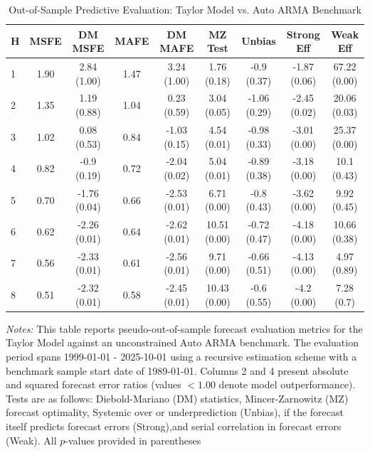\begin{table}[htbp]
\centering
\caption{Out-of-Sample Predictive Evaluation: Taylor Model vs. Auto ARMA Benchmark}
\label{tab:taylor_model_evaluation}
\footnotesize
\begin{tabular}{l cccccccc}
\hline\hline
\rule{0pt}{3ex}
\textbf{H} & \textbf{MSFE} & \textbf{DM MSFE} & \textbf{MAFE} & \textbf{DM MAFE} & \textbf{MZ Test} & \textbf{Unbias} & \textbf{Strong Eff} & \textbf{Weak Eff} \\[0.5ex]
\hline
\rule{0pt}{2.5ex}
1 & 1.90 & 2.84 (1.00) & 1.47 & 3.24 (1.00) & 1.76 (0.18) & -0.9 (0.37) & -1.87 (0.06) & 67.22 (0.00) \\
2 & 1.35 & 1.19 (0.88) & 1.04 & 0.23 (0.59) & 3.04 (0.05) & -1.06 (0.29) & -2.45 (0.02) & 20.06 (0.03) \\
3 & 1.02 & 0.08 (0.53) & 0.84 & -1.03 (0.15) & 4.54 (0.01) & -0.98 (0.33) & -3.01 (0.00) & 25.37 (0.00) \\
4 & 0.82 & -0.9 (0.19) & 0.72 & -2.04 (0.02) & 5.04 (0.01) & -0.89 (0.38) & -3.18 (0.00) & 10.1 (0.43) \\
5 & 0.70 & -1.76 (0.04) & 0.66 & -2.53 (0.01) & 6.71 (0.00) & -0.8 (0.43) & -3.62 (0.00) & 9.92 (0.45) \\
6 & 0.62 & -2.26 (0.01) & 0.64 & -2.62 (0.01) & 10.51 (0.00) & -0.72 (0.47) & -4.18 (0.00) & 10.66 (0.38) \\
7 & 0.56 & -2.33 (0.01) & 0.61 & -2.56 (0.01) & 9.71 (0.00) & -0.66 (0.51) & -4.13 (0.00) & 4.97 (0.89) \\
8 & 0.51 & -2.32 (0.01) & 0.58 & -2.45 (0.01) & 10.43 (0.00) & -0.6 (0.55) & -4.2 (0.00) & 7.28 (0.7) \\
\hline\hline
\end{tabular}%
\par\smallskip
\parbox{\textwidth}{\scriptsize \textit{Notes:} This table reports pseudo-out-of-sample forecast evaluation metrics for the Taylor Model against an unconstrained Auto ARMA benchmark. The evaluation period spans 1999-01-01 - 2025-10-01 using a recursive estimation scheme with a benchmark sample start date of 1989-01-01. Columns 2 and 4 present absolute and squared forecast error ratios (values $< 1.00$ denote model outperformance). Tests are as follows: Diebold-Mariano (DM) statistics, Mincer-Zarnowitz (MZ) forecast optimality, Systemic over or underprediction (Unbias), if the forecast itself predicts forecast errors (Strong),and serial correlation in forecast errors (Weak). All $p$-values provided in parentheses}
\end{table}
